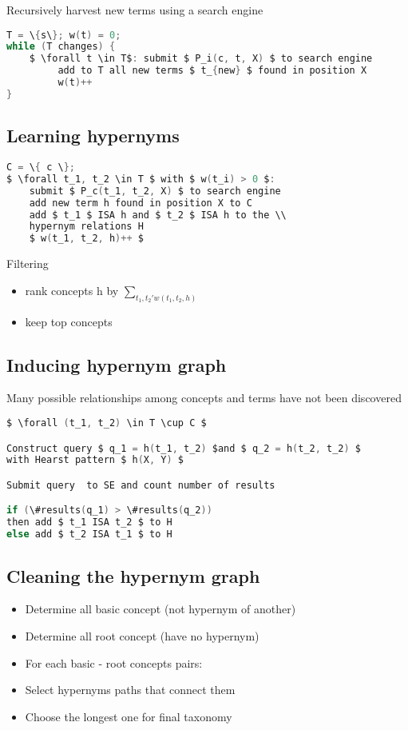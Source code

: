 Recursively harvest new terms using a search engine
\begin{lstlisting}[language=C,mathescape=true]
T = \{s\}; w(t) = 0;
while (T changes) {
    $ \forall t \in T$: submit $ P_i(c, t, X) $ to search engine
         add to T all new terms $ t_{new} $ found in position X
         w(t)++
}
\end{lstlisting}

\subsection{Learning hypernyms}

\begin{lstlisting}[language=C,mathescape=true]
C = \{ c \};
$ \forall t_1, t_2 \in T $ with $ w(t_i) > 0 $:
    submit $ P_c(t_1, t_2, X) $ to search engine
    add new term h found in position X to C
    add $ t_1 $ ISA h and $ t_2 $ ISA h to the \\
    hypernym relations H
    $ w(t_1, t_2, h)++ $
\end{lstlisting}

Filtering
\begin{itemize}
\item rank concepts h by $ \sum_{t_1, t_2' w(t_1, t_2, h)}$
\item keep top concepts
\end{itemize}

\subsection{Inducing hypernym graph}
Many possible relationships among concepts and terms have not been
discovered

\begin{lstlisting}[language=C,mathescape=true]
$ \forall (t_1, t_2) \in T \cup C $

Construct query $ q_1 = h(t_1, t_2) $and $ q_2 = h(t_2, t_2) $
with Hearst pattern $ h(X, Y) $

Submit query  to SE and count number of results

if (\#results(q_1) > \#results(q_2))
then add $ t_1 ISA t_2 $ to H
else add $ t_2 ISA t_1 $ to H
\end{lstlisting}

\subsection{Cleaning the hypernym graph}
\begin{itemize}
\item Determine all basic concept (not hypernym of another)
\item Determine all root concept (have no hypernym)
\item For each basic - root concepts pairs:
\item Select hypernyms paths that connect them
\item Choose the longest one for final taxonomy
\end{itemize}

